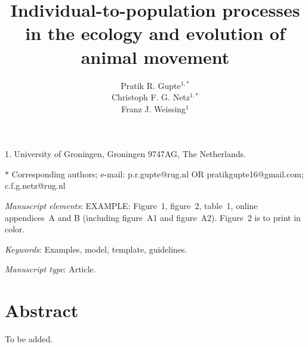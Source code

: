 \documentclass[11pt]{article}
\title{Individual-to-population processes in the ecology and evolution of animal movement}
\author{Pratik R. Gupte$^{1,\ast}$ \\ 
        Christoph F. G. Netz$^{1,\ast}$ \\ 
        Franz J. Weissing$^{1}$}
\date{}
\begin{document}
\maketitle

\noindent{} 1. University of Groningen, Groningen 9747AG, The Netherlands.

\noindent{} $\ast$ Corresponding authors; e-mail: p.r.gupte@rug.nl OR pratikgupte16@gmail.com; c.f.g.netz@rug.nl

\bigskip

\textit{Manuscript elements}: EXAMPLE: Figure~1, figure~2, table~1, online appendices~A and B (including figure~A1 and figure~A2). Figure~2 is to print in color.

\bigskip

\textit{Keywords}: Examples, model, template, guidelines.

\bigskip

\textit{Manuscript type}: Article. %

\bigskip


\linenumbers{}
\modulolinenumbers[1]

\newpage{}

\section{Abstract}

To be added.
\end{document}
